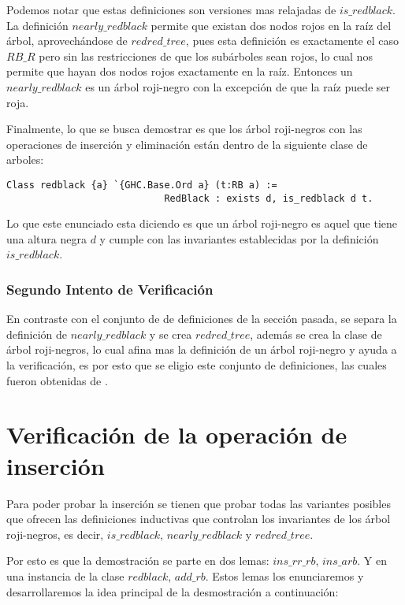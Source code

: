 \documentclass[letterpaper,12pt,oneside]{book}
\newcommand{\arn}{árbol roji-negro}
\theoremstyle{plain}
\theoremstyle{definition}
\theoremstyle{remark}
\begin{document}
Podemos notar que estas definiciones son versiones mas relajadas de $is\_redblack$. La definici\'on $nearly\_redblack$ permite que existan dos nodos rojos
en la ra\'iz del \'arbol, aprovech\'andose de $redred\_tree$, pues esta definici\'on es exactamente el caso $RB\_R$ pero sin las restricciones de que los sub\'arboles sean rojos, lo 
cual nos permite que hayan dos nodos rojos exactamente en la ra\'iz. Entonces un $nearly\_redblack$ es un {{{\arn}}} con la excepci\'on de que la ra\'iz puede ser roja. 

Finalmente, lo que se busca demostrar es que los {{{{\arn}}}s} con las operaciones de inserci\'on y eliminaci\'on están dentro de la siguiente clase de arboles:

\begin{verbatim}
Class redblack {a} `{GHC.Base.Ord a} (t:RB a) := 
                            RedBlack : exists d, is_redblack d t.
\end{verbatim}

Lo que este enunciado esta diciendo es que un {{{\arn}}} es aquel que tiene una altura negra $d$ y cumple con las invariantes establecidas por la definici\'on 
$is\_redblack$.

\subsubsection{Segundo Intento de Verificaci\'on}
En contraste con el conjunto de de definiciones de la secci\'on pasada, se separa la definici\'on de $nearly\_redblack$ y se crea $redred\_tree$, además se crea la clase de {{{{\arn}}}s}, lo cual afina mas la definici\'on de un {{{\arn}}} y ayuda a la verificaci\'on, es por esto que se eligio este conjunto de definiciones, las cuales fueron obtenidas de \cite{MSetRBT}.
\section{Verificación de la operación de inserción}

Para poder probar la inserci\'on se tienen que probar todas las variantes posibles que ofrecen las definiciones inductivas
que controlan los invariantes de los {{{{\arn}}}s}, es decir, $is\_redblack$, $nearly\_redblack$ y $redred\_tree$.

Por esto es que la demostraci\'on se parte en dos lemas: $ins\_rr\_rb$, $ins\_arb$. Y en una instancia\cite{classes} de la clase $redblack$, $add\_rb$. Estos lemas los enunciaremos
y desarrollaremos la idea principal de la desmostraci\'on a continuaci\'on:
\end{document}

